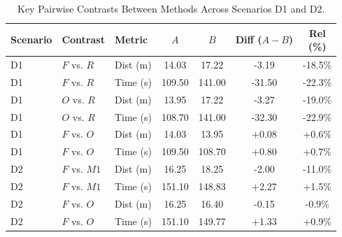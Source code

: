 \begin{table}[t]
\centering
\footnotesize
\caption{Key Pairwise Contrasts Between Methods Across Scenarios D1 and D2.}
\label{tab:pairwise_contrasts}
\setlength{\tabcolsep}{2.5pt}
\begin{tabular}{lllcccc}
\toprule
Scenario & Contrast & Metric & $A$ & $B$ & \shortstack{Diff\\($A-B$)} & \shortstack{Rel\\(\%)} \\
\midrule
D1 & $F$ vs. $R$  & Dist (m) & 14.03  & 17.22  & -3.19  & -18.5\% \\
D1 & $F$ vs. $R$  & Time (s) & 109.50 & 141.00 & -31.50 & -22.3\% \\
D1 & $O$ vs. $R$  & Dist (m) & 13.95  & 17.22  & -3.27  & -19.0\% \\
D1 & $O$ vs. $R$  & Time (s) & 108.70 & 141.00 & -32.30 & -22.9\% \\
D1 & $F$ vs. $O$  & Dist (m) & 14.03  & 13.95  & +0.08  & +0.6\%  \\
D1 & $F$ vs. $O$  & Time (s) & 109.50 & 108.70 & +0.80  & +0.7\%  \\
D2 & $F$ vs. $M1$ & Dist (m) & 16.25  & 18.25  & -2.00  & -11.0\% \\
D2 & $F$ vs. $M1$ & Time (s) & 151.10 & 148.83 & +2.27  & +1.5\%  \\
D2 & $F$ vs. $O$  & Dist (m) & 16.25  & 16.40  & -0.15  & -0.9\%  \\
D2 & $F$ vs. $O$  & Time (s) & 151.10 & 149.77 & +1.33  & +0.9\%  \\
\bottomrule
\end{tabular}
\end{table}
